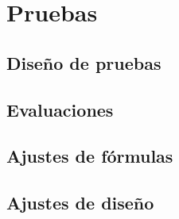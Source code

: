 \chapter{Pruebas}
\label{chap: cap4}


\section{Diseño de pruebas}


\section{Evaluaciones}


\section{ Ajustes de fórmulas }


\section{ Ajustes de diseño }


